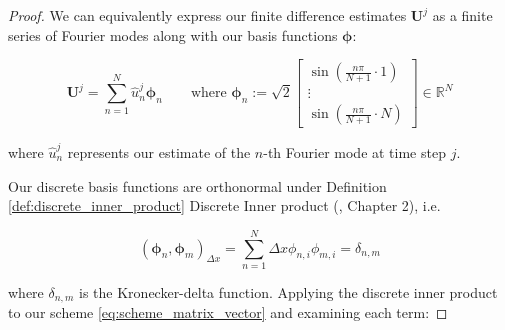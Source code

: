 \begin{proof}
We can equivalently express our finite difference estimates $\mathbf{U}^j$
as a finite series of Fourier modes along with our basis functions 
$\boldsymbol{\phi}$:

\begin{equation*}
    \boldsymbol{U}^j = \sum_{n=1}^N \hat{u}_n^j \boldsymbol{\phi}_n
    \qquad \text{where }
    \boldsymbol{\phi}_n := \sqrt{2}
    \begin{bmatrix}
        \sin\left( \frac{n \pi}{N+1} \cdot 1 \right) \\
        \vdots \\
        \sin\left( \frac{n \pi}{N+1} \cdot N \right)
    \end{bmatrix}
    \in \mathbb{R}^N
\end{equation*}

where $\hat{u}_n^j$ represents our estimate of the $n$-th Fourier 
mode at time step $j$.

Our discrete basis functions are orthonormal under Definition \ref{def:discrete_inner_product}
Discrete Inner product (\cite{strang2007computational}, Chapter 2), i.e.

\begin{equation*}
    (\boldsymbol{\phi}_n, \boldsymbol{\phi}_m)_{\Delta x} 
    = \sum_{n=1}^N \Delta x \phi_{n,i} \phi_{m,i} = \delta_{n,m}
\end{equation*}

where $\delta_{n,m}$ is the Kronecker-delta function.
Applying the discrete inner product to our 
scheme \eqref{eq:scheme_matrix_vector} and examining each term:


\end{proof}
